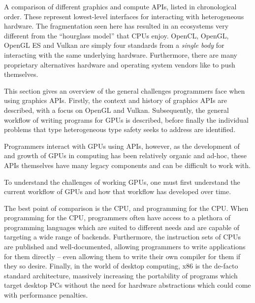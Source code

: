 \documentclass[a4paper,12pt,twoside,openright]{report}
\begin{document}
\begin{table}
\caption{ A comparison of different graphics and compute APIs, listed in
chronological order. These represent lowest-level interfaces for interacting
with heterogeneous hardware. The fragmentation seen here has resulted in an
ecosystems very different from the ``hourglass model'' that CPUs enjoy. OpenCL,
OpenGL, OpenGL ES and Vulkan are simply four standards from a \textit{single
body} for interacting with the same underlying hardware. Furthermore, there are
many proprietary alternatives hardware and operating system vendors like to
push themselves.}


\label{tbl:api_comparison}

\end{table}


This section gives an overview of the general challenges programmers face when
using graphics APIs. Firstly, the context and history of graphics APIs are
described, with a focus on OpenGL and Vulkan. Subsequently, the general
workflow of writing programs for GPUs is described, before finally the
individual problems that type heterogeneous type safety seeks to address are
identified.

Programmers interact with GPUs using APIs, however, as the development of and
growth of GPUs in computing has been relatively organic and ad-hoc, these APIs
themselves have many legacy components and can be difficult to work with.

To understand the challenges of working GPUs, one must first understand the
current workflow of GPUs and how that workflow has developed over time.

The best point of comparison is the CPU, and programming for the CPU. When
programming for the CPU, programmers often have access to a plethora of
programming languages which are suited to different needs and are capable of
targeting a wide range of backends. Furthermore, the instruction sets of CPUs
are published and well-documented, allowing programmers to write applications
for them directly -- even allowing them to write their own compiler for them
if they so desire. Finally, in the world of desktop computing, x86 is the
de-facto standard architecture, massively increasing the portability of
programs which target desktop PCs without the need for hardware abstractions
which could come with performance penalties.
\end{document}
